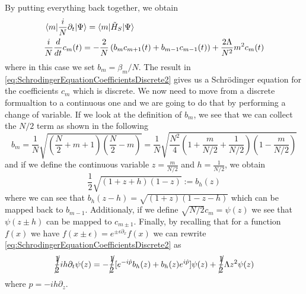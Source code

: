 By putting everything back together, we obtain
\begin{align}
	 & \braket{m|\frac{i}{N}\partial_t|\Psi} = \braket{m|\tilde{H}_{S}|\Psi}\label{eq:SchrodingerEquationCoefficientsDiscrete1}                                                               \\
	 & \frac{i}{N}\frac{d}{dt}c_{m}(t) =  -\frac{2}{N}\left( b_{m}c_{m+1}(t) + b_{m-1}c_{m-1}(t) \right) + \frac{2\Lambda}{N^2}m^2c_{m}(t)\label{eq:SchrodingerEquationCoefficientsDiscrete2}
\end{align}
where in this case we set $ b_{m} = \beta_m/N $.
The result in \cref{eq:SchrodingerEquationCoefficientsDiscrete2} gives us a Schr{\"o}dinger equation for the coefficients $ c_{m} $ which is discrete. We now need to move from a discrete formualtion to a continuous one and we are going to do that by performing a change of variable.
If we look at the definition of $ b_{m} $, we see that we can collect the $ N/2 $ term as shown in the following
\begin{equation}
	\label{eq:CoefficientCollectingN}
	b_m =\frac{1}{N}\sqrt{
		\left(\frac{N}{2} + m +1\right)  \left(\frac{N}{2} -m\right)
	}  =
	\frac{1}{N}\sqrt{
		\frac{N^2}{4}
		\left(1 + \frac{m}{N/2} +\frac{1}{N/2}\right)
		\left(1 -\frac{m}{N/2}\right)
	}
\end{equation}
and if we define the continuous variable $ z = \frac{m}{N/2} $  and $ h = \frac{1}{N/2} $, we obtain
\begin{equation}
	\label{eq:CoefficientContinuous}
	\frac{1}{2}
	\sqrt{
		\left(1 + z +h\right)
		\left(1 -z\right)
	}
	:=  b_{h}(z)
\end{equation}
where we can see that $ b_{h}(z-h) = \sqrt{ \left(1 + z \right)\left(1 -z -h\right) } $ which can be mapped back to $ b_{m-1} $.
Additionaly, if we define $ \sqrt{N/2}  c_{m}= \psi(z) $ we see that $ \psi(z \pm h) $ can be mapped to $ c_{m\pm 1} $.
Finally, by recalling that for a function $f(x)$ we have $ f(x \pm \epsilon) = e^{\pm \epsilon\partial_{x}}f(x) $ we can rewrite \cref{eq:SchrodingerEquationCoefficientsDiscrete2} as
\begin{equation}
	\label{eq:SchrodingerEquationCoefficientsContinuous}
	\cancel{\frac{1}{2}}ih\partial_t\psi(z) =
	-\cancel{\frac{1}{2}}[ e^{-i\hat{p}} b_{h}(z) + b_{h}(z)e^{i\hat{p}} ]\psi(z) +
	\cancel{\frac{1}{2}}\Lambda z^2 \psi(z)
\end{equation}
where $ \hat{p} = -ih\partial_z $.
